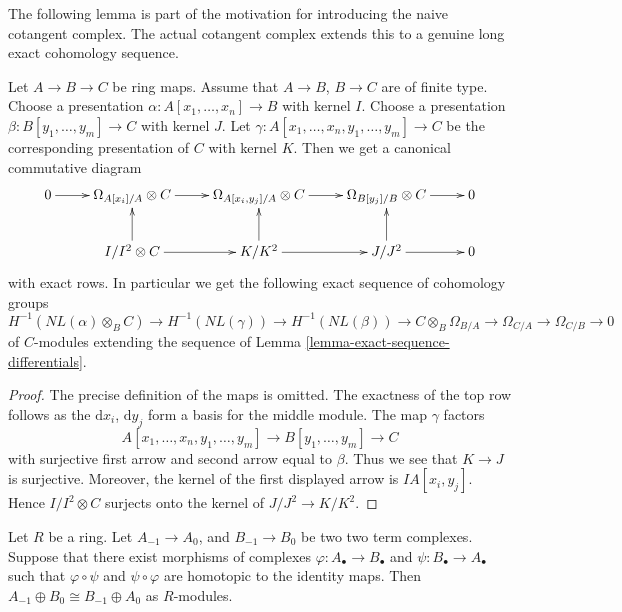 \noindent
The following lemma is part of the motivation for introducing the
naive cotangent complex. The actual cotangent complex extends this
to a genuine long exact cohomology sequence.

\begin{lemma}
\label{lemma-exact-sequence-NL}
Let $A \to B \to C$ be ring maps.
Assume that $A \to B$, $B \to C$ are of finite type.
Choose a presentation $\alpha : A[x_1, \ldots, x_n] \to B$
with kernel $I$.
Choose a presentation $\beta : B[y_1, \ldots, y_m] \to C$ with kernel $J$.
Let $\gamma : A[x_1, \ldots, x_n, y_1, \ldots, y_m] \to C$ be
the corresponding presentation of $C$ with kernel $K$. Then we get a
canonical commutative diagram
$$
\xymatrix{
0 \ar[r] &
\Omega_{A[x_i]/A} \otimes C \ar[r] &
\Omega_{A[x_i, y_j]/A} \otimes C \ar[r] &
\Omega_{B[y_j]/B} \otimes C \ar[r] &
0 \\
&
I/I^2 \otimes C \ar[r] \ar[u] &
K/K^2 \ar[r] \ar[u] &
J/J^2 \ar[r] \ar[u] &
0
}
$$
with exact rows. In particular we get the following exact sequence
of cohomology groups
$$
H^{-1}(NL(\alpha) \otimes_B C) \to
H^{-1}(NL(\gamma)) \to
H^{-1}(NL(\beta)) \to
C \otimes_B \Omega_{B/A} \to
\Omega_{C/A} \to
\Omega_{C/B} \to 0
$$
of $C$-modules extending the sequence of
Lemma \ref{lemma-exact-sequence-differentials}.
\end{lemma}

\begin{proof}
The precise definition of the maps is omitted.
The exactness of the top row follows as the $\text{d}x_i$,
$\text{d}y_j$ form a basis for the middle module.
The map $\gamma$ factors
$$
A[x_1, \ldots, x_n, y_1, \ldots, y_m] \to
B[y_1, \ldots, y_m] \to C
$$
with surjective first arrow and second arrow equal to $\beta$.
Thus we see that $K \to J$ is surjective.
Moreover, the kernel of the first displayed arrow is
$IA[x_i, y_j]$. Hence $I/I^2 \otimes C$ surjects onto the
kernel of $J/J^2 \to K/K^2$.
\end{proof}

\begin{lemma}
\label{lemma-sum-two-terms}
Let $R$ be a ring.
Let $A_{-1} \to A_0$, and $B_{-1} \to B_0$ be
two two term complexes. Suppose that there exist
morphisms of complexes $\varphi : A_\bullet \to B_\bullet$
and $\psi : B_\bullet \to A_\bullet$ such that
$\varphi \circ \psi$ and $\psi \circ \varphi$ are
homotopic to the identity maps.
Then $A_{-1} \oplus B_0 \cong B_{-1} \oplus A_0$ as
$R$-modules.
\end{lemma}

